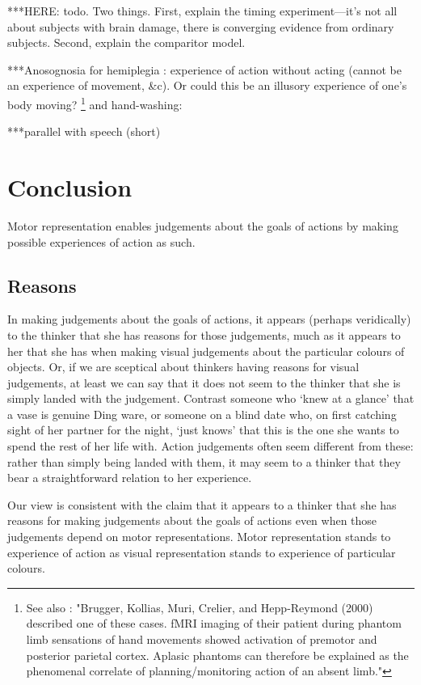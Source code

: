 \documentclass[12pt,\papersize]{extarticle}
\begin{document}
***HERE: todo.  Two things.  First, explain the timing experiment---it's not all about subjects with brain damage, there is converging evidence from ordinary subjects.  Second, explain the comparitor model.  

***Anosognosia for hemiplegia : experience of action without acting (cannot be an experience of movement, \&c).  Or could this be an illusory experience of one's body moving?  \citep{garbarini:2012_moving}%
\footnote{
See also \citet{gallese:2010_bodily}: "Brugger, Kollias, Muri, Crelier, and Hepp-Reymond (2000) described one of these cases. fMRI imaging of their patient during phantom limb sensations of hand movements showed activation of premotor and posterior parietal cortex. Aplasic phantoms can therefore be explained as the phenomenal correlate of planning/monitoring action of an absent limb."}
and hand-washing: \citep{berti:2008_motor}

***parallel with speech (short)



\section{Conclusion}
Motor representation enables judgements about the goals of actions by making possible experiences of action as such.  

\subsection{Reasons}
In making judgements about the goals of actions, it appears (perhaps veridically) to the thinker that she has reasons for those judgements, much as it appears to her that she has when making visual judgements about the particular colours of objects.  Or, if we are sceptical about thinkers having reasons for visual judgements, at least we can say that it does not seem to the thinker that she is simply landed with the judgement.  Contrast someone who `knew at a glance' that a vase is genuine Ding ware, or someone on a blind date who, on first catching sight of her partner for the night, `just knows' that this is the one she wants to spend the rest of her life with.  Action judgements often seem different from these: rather than simply being landed with them, it may seem to a thinker that they bear a straightforward relation to her experience. 

Our view is consistent with the claim that it appears to a thinker that she has reasons for making judgements about the goals of actions even when  those judgements depend on motor representations.
  Motor representation stands to experience of action as visual representation stands to experience of particular colours. 
\end{document}
